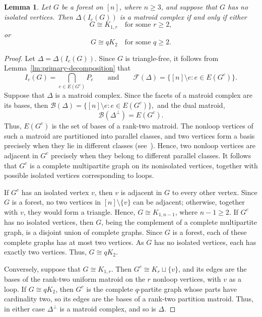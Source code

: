 \documentclass[12pt]{amsart}
\newtheorem{lemma}[proposition]{Lemma}
\begin{document}
\begin{lemma}\label{lem:forest-matroid}
Let \(G\) be a forest on \([n]\), where \(n\ge3\), and suppose that
\(G\) has no isolated vertices. Then \(\Delta(I_c(G))\) is a matroid complex if and only if either
\[
G\cong K_{1,r}\quad\text{for some }r\ge2,
\]
or
\[
G\cong qK_2\quad\text{for some }q\ge2.
\]
\end{lemma}

\begin{proof}
Let \(\Delta=\Delta(I_c(G))\). Since \(G\) is triangle-free, it follows from Lemma~\ref{lm:primary-decomposition} that
\[
I_c(G)=\bigcap_{e\in E(G^c)}P_e
\qquad\text{and}\qquad
\mathcal F(\Delta)=\{[n]\setminus e:e\in E(G^c)\}.
\]
Suppose that \(\Delta\) is a matroid complex. Since the facets of a matroid complex are its bases, then $\mathcal B(\Delta) =\{[n]\setminus e:e\in E(G^c)\},$ and the dual matroid,
\[
\mathcal B(\Delta^\perp)=E(G^c).
\]
Thus, \(E(G^c)\) is the set of bases of a rank-two matroid. The nonloop vertices of such a matroid are partitioned into parallel classes, and two vertices form a basis precisely when they lie in different classes (see~\cite[Section 1.1 ]{Oxley}). Hence, two nonloop vertices are adjacent in \(G^c\) precisely when they belong to different parallel classes. It follows that \(G^c\) is a complete multipartite graph on its nonisolated vertices, together with possible isolated vertices corresponding to loops.

If \(G^c\) has an isolated vertex \(v\), then \(v\) is adjacent in \(G\) to every other vertex. Since \(G\) is a forest, no two vertices in \([n]\setminus\{v\}\) can be adjacent; otherwise, together with \(v\), they would form a triangle. Hence, \(G\cong K_{1,n-1}\), where \(n-1\geq2\). If \(G^c\) has no isolated vertices, then \(G\), being the complement of a complete multipartite graph, is a disjoint union of complete graphs.
Since \(G\) is a forest, each of these complete graphs has at most two
vertices. As \(G\) has no isolated vertices, each has exactly two
vertices. Thus, \(G\cong qK_2\).



Conversely, suppose that \(G\cong K_{1,r}\). Then \(G^c\cong K_r\sqcup\{v\}\), and its edges are the bases of the rank-two uniform matroid on the \(r\) nonloop vertices, with \(v\) as a loop. If \(G\cong qK_2\), then \(G^c\) is the complete \(q\)-partite graph whose parts have cardinality two, so its edges are the bases of a rank-two partition matroid. Thus, in either case \(\Delta^\perp\) is a matroid complex, and so is \(\Delta\).
\end{proof}
\end{document}
